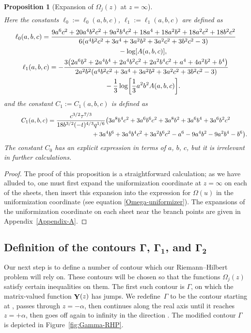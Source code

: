 \documentclass[10pt,a4paper]{amsart}
\DeclareMathOperator{\YY}{{\bf Y}}
\numberwithin{equation}{section}
\newtheorem{Proposition}[Theorem]{Proposition}
 { \theoremstyle{definition}
\newtheorem{Definition}[Theorem]{Definition}
\newtheorem{Note}[Theorem]{Note}
\newtheorem{Example}[Theorem]{Example}
\newtheorem{Remark}[Theorem]{Remark} }
\begin{document}
\begin{Proposition}[Expansion of $\Omega_j(z)$ at $z=\infty$]
\begin{align}
 \end{align}
 Here the constants $\ell_0 := \ell_0(a,b,c)$, $\ell_1 := \ell_1(a,b,c)$ are defined as
 \begin{gather*}
 \ell_0(a,b,c) = \frac{9a^6c^2 + 20a^4b^2c^2 + 9a^2b^4c^2 + 18a^4 + 18a^2b^2 + 18a^2c^2 + 18b^2c^2}{6(a^4b^2c^2 + 3a^4 + 3a^2b^2 + 3a^2c^2 + 3b^2c^2 - 3)}\\
 \hphantom{\ell_0(a,b,c) =}{}
 -\log[A(a,b,c)],\\
 \ell_1(a,b,c) = -\frac{3\bigl(2a^6b^2 + 2a^4b^4 + 2a^4b^2c^2 + 2a^2b^4c^2 + a^4 + 4a^2b^2 + b^4\bigr)}{2a^2b^2(a^4b^2c^2 + 3a^4 + 3a^2b^2 + 3a^2c^2 + 3b^2c^2 - 3)}\\
 \hphantom{\ell_1(a,b,c) =}{}
 - \frac{1}{3}\log \biggl[\frac{1}{3}a^2b^2 A(a,b,c)\biggr].
 \end{gather*}
 and the constant $C_1 := C_1(a,b,c)$ is defined as
 \begin{gather}
 C_1(a,b,c) = \frac{c^{3/2}\tau^{7/3}}{18b^{3/2}(-t)^{4/3}q^{1/6}}\bigl(3a^8b^4c^2 + 3a^6b^6c^2 + 3a^8b^2 + 3a^6b^4 + 3a^6b^2c^2\label{C1-constant}\\
 \hphantom{C_1(a,b,c) = \frac{c^{3/2}\tau^{7/3}}{18b^{3/2}(-t)^{4/3}q^{1/6}}\bigl(}{}
 + 3a^4b^6 + 3a^4b^4c^2 + 3a^2b^6c^2 - a^6 - 9a^4b^2 - 9a^2b^4 - b^6\bigr).\nonumber
 \end{gather}
 \textit{The constant $C_0$ has an explicit expression in terms of $a$, $b$, $c$, but it is irrelevant in further calculations.}
 \end{Proposition}
 \begin{proof}
 The proof of this proposition is a straightforward calculation; as we have alluded to, one must first expand the uniformization coordinate at $z=\infty$ on each of the
 sheets, then insert this expansion into the expression for $\Omega(u)$ in the uniformization coordinate (see equation \eqref{Omega-uniformizer}). The expansions of the uniformization coordinate on each sheet near the branch points are given in Appendix~\ref{Appendix-A}.
 \end{proof}


\subsection[Definition of the contours $\Gamma$, $\Gamma_1$, and $\Gamma_2$]{Definition of the contours $\boldsymbol{\Gamma}$, $\boldsymbol{\Gamma_1}$, and $\boldsymbol{\Gamma_2}$}
Our next step is to define a number of contour which our Riemann--Hilbert problem will rely on.
These contours will be chosen so that the functions $\Omega_j(z)$ satisfy certain inequalities on them. The first such contour is $\Gamma$, on which the
matrix-valued function $\YY(z)$ has jumps. We redefine~$\Gamma$ to be the contour starting at , passes through $z=-\alpha$,
then continues along the real axis until it reaches $z= + \alpha$, then goes off again to infinity in the direction . The modified
contour $\Gamma$ is depicted in Figure~\ref{fig:Gamma-RHP}.
\end{document}
